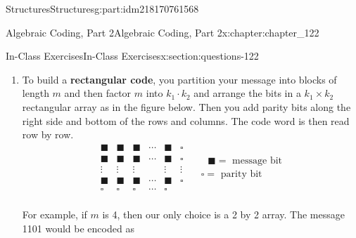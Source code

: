 \documentclass[oneside,10pt,]{book}
\newcommand{\terminology}[1]{\textbf{#1}}
\numberwithin{equation}{section}
\begin{document}
\begin{partptx}{Structures}{}{Structures}{}{}{g:part:idm218170761568}
\begin{chapterptx}{Algebraic Coding, Part 2}{}{Algebraic Coding, Part 2}{}{}{x:chapter:chapter_122}
\begin{sectionptx}{In-Class Exercises}{}{In-Class Exercises}{}{}{x:section:questions-122}
\begin{enumerate}[label=\arabic*.]
\begin{equation*}
G=\left(
\begin{array}{cccc}
1 & 0 & 1 & 0 \\
0 & 1 & 1 & 1 \\
\end{array}
\right)
\end{equation*}
%
\par
%
\begin{enumerate}[label=(\alph*)]
\item{}What size blocks does this code encode and what is the length of the code words?%
\item{}What are the code words for this code?%
\item{}With this code, can you detect single bit errors?  Can you correct all, some, or no single bit errors?%
\end{enumerate}
%
\item{}To build a \terminology{rectangular code}, you partition your message into blocks of length \(m\) and then factor \(m\) into \(k_1\cdot k_2\)  and arrange the bits in a  \(k_1 \times k_2\) rectangular array as in the figure below.  Then you add parity bits along the right side and bottom of the rows and columns.   The code word is then read row by row.%
\begin{equation*}
\begin{array}{cccccc}
\blacksquare  & \blacksquare  & \blacksquare  & \cdots  & \blacksquare  & \square  \\
\blacksquare  & \blacksquare  & \blacksquare  & \cdots  & \blacksquare  & \square  \\
\vdots  & \vdots  & \vdots  &   & \vdots  & \vdots  \\
\blacksquare  & \blacksquare  & \blacksquare  & \cdots  & \blacksquare  & \square  \\
\square  & \square  & \square  & \cdots  & \square  &   \\
\end{array}  \quad \begin{array}{c}
\textrm{      }\blacksquare  = \textrm{ message} \textrm{ bit} \\
\square  =\textrm{ parity} \textrm{ bit} \\
\end{array}
\end{equation*}
%
\par
For example, if \(m\) is 4, then our only choice is a 2 by 2 array.  The message 1101 would be encoded as%
\begin{equation*}

\end{equation*}
\end{enumerate}
\end{sectionptx}
\end{chapterptx}
\end{partptx}
\end{document}
